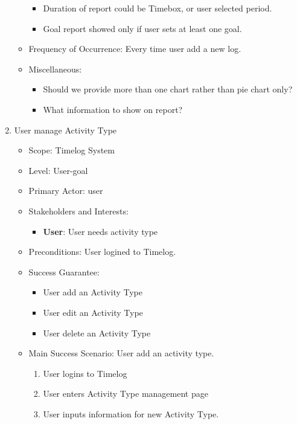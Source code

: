 \documentclass[12pt, a4paper]{article}
\begin{document}
\begin{CJK*}{UTF8}{bkai}
\begin{enumerate}
\begin{itemize}
            \begin{itemize}
              \item Duration of report could be Timebox, or user selected period.
              \item Goal report showed only if user sets at least one goal.
            \end{itemize}
          \item Frequency of Occurrence: Every time user add a new log.
          \item Miscellaneous:
            \begin{itemize}
              \item Should we provide more than one chart rather than pie chart only?
              \item What information to show on report?
            \end{itemize}
        \end{itemize}
      \item User manage Activity Type
        \begin{itemize}
          \item Scope: Timelog System
          \item Level: User-goal
          \item Primary Actor: user
          \item Stakeholders and Interests:
            \begin{itemize}
              \item {\bf User}: User needs activity type
            \end{itemize}
          \item Preconditions: User logined to Timelog.
          \item Success Guarantee:
            \begin{itemize}
              \item User add an Activity Type
              \item User edit an Activity Type
              \item User delete an Activity Type
            \end{itemize}
          \item Main Success Scenario: User add an activity type.
            \begin{enumerate}
              \item User logins to Timelog
              \item User enters Activity Type management page
              \item User inputs information for new Activity Type.

\end{enumerate}
\end{itemize}
\end{enumerate}
\end{CJK*}
\end{document}
